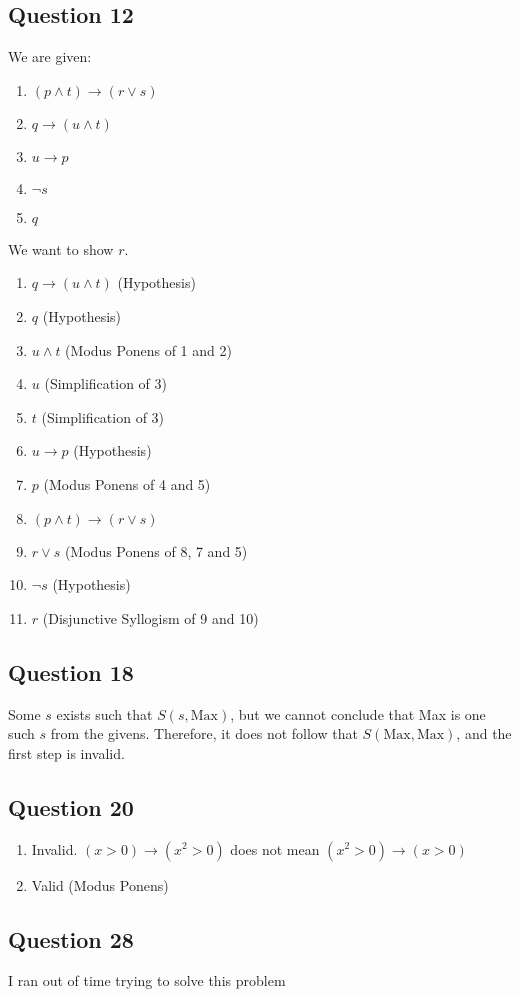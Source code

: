 \documentclass[12pt]{article}
\begin{document}
\subsection*{Question 12}

We are given:

\begin{enumerate}
  \item $(p \land t) \to (r \lor s)$
  \item $q \to (u \land t)$
  \item $u \to p$
  \item $\neg s$
  \item $q$
\end{enumerate}

We want to show $r$.

\begin{enumerate}
  \item $q \to (u \land t)$ (Hypothesis)
  \item $q$ (Hypothesis)
  \item $u \land t$ (Modus Ponens of 1 and 2)
  \item $u$ (Simplification of 3)
  \item $t$ (Simplification of 3)
  \item $u \to p$ (Hypothesis)
  \item $p$ (Modus Ponens of 4 and 5)
  \item $(p \land t) \to (r \lor s)$
  \item $r \lor s$ (Modus Ponens of 8, 7 and 5)
  \item $\neg s$ (Hypothesis)
  \item $r$ (Disjunctive Syllogism of 9 and 10)
\end{enumerate}

\subsection*{Question 18}

Some $s$ exists such that $S(s, \text{Max} )$, but we cannot conclude that Max
is one such $s$ from the givens. Therefore, it does not follow that 
$S(\text{Max} , \text{Max} )$, and the first step is invalid.

\subsection*{Question 20}

\begin{enumerate}[label=(\alph*)]
  \item Invalid. $(x > 0) \to (x^2 > 0)$ does not mean $(x^2 > 0) \to (x>0)$
\item Valid (Modus Ponens)
\end{enumerate}

\subsection*{Question 28}

I ran out of time trying to solve this problem
\end{document}
